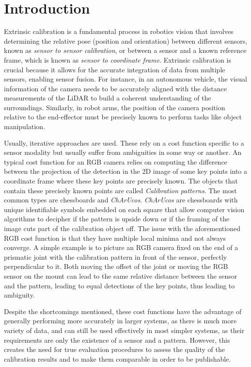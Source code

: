 \section{Introduction}
\label{sec:introduction}

Extrinsic calibration is a fundamental process in robotics vision that involves determining the
relative pose (position and orientation) between different sensors, known as \textit{sensor to sensor calibration}, or between a sensor and a known reference
frame, which is known as \textit{sensor to coordinate frame}. Extrinsic calibration is crucial because it allows for the accurate integration of data from multiple sensors,
enabling sensor fusion. For instance, in an autonomous vehicle, the visual information of the camera
needs to be accurately aligned with the distance measurements of the LiDAR to build a coherent understanding of the
surroundings. Similarly, in robot arms, the position of the camera position relative to the end-effector must be precisely
known to perform tasks like object manipulation. 

Usually, iterative approaches are used. These rely on a cost function specific to a sensor modality but usually suffer from ambiguities
in some way or another. An typical cost function for an RGB camera relies on computing the difference between the projection of the
detection in the 2D image of some key points into a coordinate frame where these key points are precisely known. The objects that
contain these precisely known points are called \textit{Calibration patterns}. The most common types are chessboards and \textit{ChArUcos}.
\textit{ChArUcos} are chessboards with unique identifiable symbols embedded on each square that allow computer vision algorithms to decipher if the
pattern is upside down or if the framing of the image cuts part of the calibration object off. The issue with the aforementioned RGB cost function is that they
have multiple local minima and not always converge. A simple example is to picture an RGB camera fixed on the end of a prismatic joint
with the calibration pattern in front of the sensor, perfectly perpendicular to it. Both moving the offset of the joint or
moving the RGB sensor on the mount can lead to the same relative distance between the sensor and
the pattern, leading to equal detections of the key points, thus leading to
ambiguity. 

Despite the shortcomings mentioned, these cost functions have the advantage of generally performing more accurately in larger systems,
as there is much more variety of data, and can still be used effectively in most simpler systems, as their requirements are only the
existence of a sensor and a pattern. However, this creates the need for true evaluation procedures to assess the quality of the
calibration results and to make them comparable in order to be publishable. 

